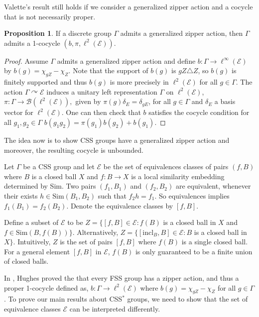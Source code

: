 \documentclass[12pt]{amsart}
\numberwithin{equation}{subsection}
\theoremstyle{definition}
\newtheorem{proposition}[theorem]{Proposition}
\theoremstyle{definition}
\theoremstyle{remark}
\begin{document}
Valette's result still holds if we consider a generalized zipper action and a cocycle that is not necessarily proper. 

\begin{proposition}\label{prop:zippercocycle}
    If a discrete group $\Gamma$ admits a generalized zipper action, then $\Gamma$ admits a 1-cocycle $(b,\pi,\ell^2(\mathcal E))$. 
\end{proposition}
    

\begin{proof}
    Assume $\Gamma$ admits a generalized zipper action and define $b: \Gamma \rightarrow \ell^\infty(\mathcal E)$ by $b(g) = \chi_{gZ}-\chi_Z$. Note that the support of $b(g)$ is $gZ \triangle Z$, so $b(g)$ is finitely supported and thus $b(g)$ is more precisely in $\ell^2(\mathcal E)$ for all $g \in \Gamma$. The action $\Gamma \curvearrowright \mathcal E$ induces a unitary left representation $\Gamma$ on $\ell^2(\mathcal E)$, $\pi:\Gamma \rightarrow \mathcal B(\ell^2(\mathcal E)),$ given by $\pi(g)\delta_E = \delta_{gE}$, for all $g \in \Gamma$ and  $\delta_E$ a basis vector for $\ell^2(\mathcal E)$. One can then check that $b$ satisfies the cocycle condition for all $g_1, g_2 \in \Gamma$ $b(g_1g_2) = \pi(g_1)b(g_2)+b(g_1)$. 
    
\end{proof}

The idea now is to show CSS groups have a generalized zipper action and moreover, the resulting cocycle is unbounded. 

Let $\Gamma$ be a CSS group and let $\mathcal E$ be the set of equivalences classes of pairs $(f,B)$ where $B$ is a closed ball $X$ and $f:B \rightarrow X$ is a local similarity embedding determined by Sim. Two pairs $(f_1,B_1)$ and $(f_2,B_2)$ are equivalent, whenever their exists $h \in \text{Sim}(B_1,B_2)$ such that $f_2h=f_1$. So equivalences implies $f_1(B_1) = f_2(B_2)$. Denote the equivalence classes by $[f, B]$. 

Define a subset of $\mathcal E$ to be $Z= \{ [f,B] \in \mathcal E : f(B)$ is a closed ball in $X$ and $f \in \text{Sim}(B,f(B))\}$. Alternatively, $Z= \{ [\text{incl}_B,B] \in  \mathcal E : B$ is a closed ball in $X\}$. Intuitively, $Z$ is the set of pairs $[f,B]$ where $f(B)$ is a single closed ball. For a general element $[f,B]$ in $\mathcal E$, $f(B)$ is only guaranteed to be a finite union of closed balls. 

In \cite[Theorem 6.1]{hughes2009}, Hughes proved the that every FSS group has a zipper action, and thus a proper 1-cocycle defined as, $b: \Gamma \rightarrow \ell^2(\mathcal E)$ where $b(g) = \chi_{gZ}-\chi_Z$ for all $g \in \Gamma$. To prove our main results about CSS$^*$ groups, we need to show that the set of equivalence classes $\mathcal E$ can be interpreted differently.
\end{document}
